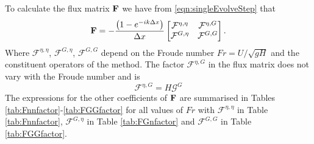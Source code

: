 To calculate the flux matrix $\mathbf{F}$ we have from \eqref{eqn:singleEvolveStep} that
\begin{equation*}
 \mathbf{F} = - \dfrac{\left(1 - e^{-ik\Delta x}\right)}{ \Delta x}\begin{bmatrix}
 \mathcal{F}^{\eta,\eta} & \mathcal{F}^{\eta,G} \\\mathcal{F}^{G,\eta} &\mathcal{F}^{G,G}
 \end{bmatrix}.
\end{equation*}
Where $\mathcal{F}^{\eta,\eta} $, $\mathcal{F}^{G,\eta} $, $\mathcal{F}^{G,G} $ depend on the Froude number $Fr = {U}/{\sqrt{gH}}$ and the constituent operators of the method. The factor $\mathcal{F}^{\eta,G}$ in the flux matrix does not vary with the Froude number and is
\[\mathcal{F}^{\eta,G} = H \mathcal{G}^G \]
The expressions for the other coefficients of $\mathbf{F}$ are summarised in Tables \ref{tab:Fnnfactor}-\ref{tab:FGGfactor} for all values of $Fr$ with $\mathcal{F}^{\eta,\eta}$ in Table \ref{tab:Fnnfactor}, $\mathcal{F}^{G,\eta}$ in Table \ref{tab:FGnfactor} and $\mathcal{F}^{G,G}$ in Table \ref{tab:FGGfactor}.



